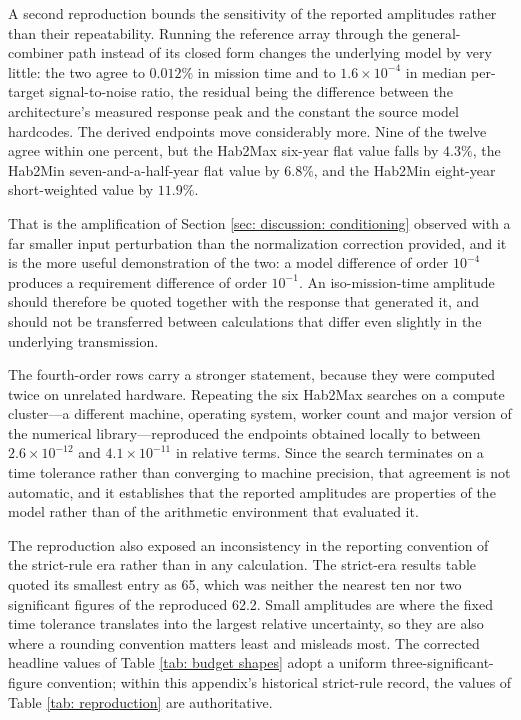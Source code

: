 \documentclass[12pt,a4paper]{article}
\numberwithin{equation}{section}
\numberwithin{figure}{section}
\numberwithin{table}{section}
\begin{document}
A second reproduction bounds the sensitivity of the reported amplitudes rather than their repeatability. Running the reference array through the general-combiner path instead of its closed form changes the underlying model by very little: the two agree to $0.012\%$ in mission time and to $1.6\times10^{-4}$ in median per-target signal-to-noise ratio, the residual being the difference between the architecture's measured response peak and the constant the source model hardcodes. The derived endpoints move considerably more. Nine of the twelve agree within one percent, but the Hab2Max six-year flat value falls by $4.3\%$, the Hab2Min seven-and-a-half-year flat value by $6.8\%$, and the Hab2Min eight-year short-weighted value by $11.9\%$.

That is the amplification of Section \ref{sec: discussion: conditioning} observed with a far smaller input perturbation than the normalization correction provided, and it is the more useful demonstration of the two: a model difference of order $10^{-4}$ produces a requirement difference of order $10^{-1}$. An iso-mission-time amplitude should therefore be quoted together with the response that generated it, and should not be transferred between calculations that differ even slightly in the underlying transmission.

The fourth-order rows carry a stronger statement, because they were computed twice on unrelated hardware. Repeating the six Hab2Max searches on a compute cluster---a different machine, operating system, worker count and major version of the numerical library---reproduced the endpoints obtained locally to between $2.6\times10^{-12}$ and $4.1\times10^{-11}$ in relative terms. Since the search terminates on a time tolerance rather than converging to machine precision, that agreement is not automatic, and it establishes that the reported amplitudes are properties of the model rather than of the arithmetic environment that evaluated it.

The reproduction also exposed an inconsistency in the reporting convention of the strict-rule era rather than in any calculation. The strict-era results table quoted its smallest entry as 65, which was neither the nearest ten nor two significant figures of the reproduced 62.2. Small amplitudes are where the fixed time tolerance translates into the largest relative uncertainty, so they are also where a rounding convention matters least and misleads most. The corrected headline values of Table \ref{tab: budget shapes} adopt a uniform three-significant-figure convention; within this appendix's historical strict-rule record, the values of Table \ref{tab: reproduction} are authoritative.
\end{document}
